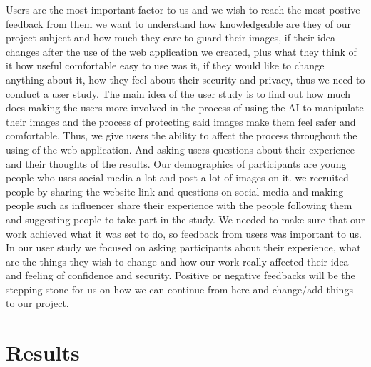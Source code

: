 \documentclass[sigconf]{acmart}
\begin{document}
Users are the most important factor to us and we wish to reach the most postive feedback from them we want to understand how knowledgeable are they of our project subject and how much they care to guard their images, if their idea changes after the use of the web application we created, plus what they think of it how useful comfortable easy to use was it, if they would like to change anything about it, how they feel about their security and privacy, thus we need to conduct a user study. The main idea of the user study is to find out how much does making the users more involved in the process of using the AI to manipulate their images and the process of protecting said images make them feel safer and comfortable. Thus, we give users the ability to affect the process throughout the using of the web application. And asking users questions about their experience and their thoughts of the results. Our demographics of participants are young people who uses social media a lot and post a lot of images on it. we recruited people by sharing the website link and questions on social media and making people such as influencer share their experience with the people following them and suggesting people to take part in the study. We needed to make sure that our work achieved what it was set to do, so feedback from users was important to us. In our user study we focused on asking participants about their experience, what are the things they wish to change and how our work really affected their idea and feeling of confidence and security. Positive or negative feedbacks will be the stepping stone for us on how we can continue from here and change/add things to our project. 

\section{Results}
\end{document}
